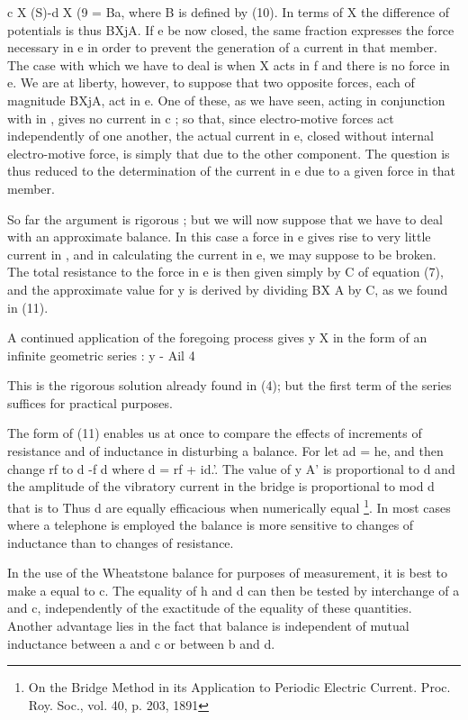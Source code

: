 c X (S)-d X (9 = Ba, where B is defined by (10). In terms of X the difference
of potentials is thus BXjA. If e be now closed, the same fraction expresses the
force necessary in e in order to prevent the generation of a current in that
member.  The case with which we have to deal is when X acts in f and there is
no force in e. We are at liberty, however, to suppose that two opposite
forces, each of magnitude BXjA, act in e. One of these, as we have seen, acting
in conjunction with in , gives no current in c ; so that, since electro-motive
forces act independently of one another, the actual current in e, closed
without internal electro-motive force, is simply that due to the other
component.  The question is thus reduced to the determination of the current in
e due to a given force in that member.

So far the argument is rigorous ; but we will now suppose that we have to deal
with an approximate balance. In this case a force in e gives rise to very
little current in , and in calculating the current in e, we may suppose  to be
broken. The total resistance to the force in e is then given simply by C of
equation (7), and the approximate value for y is derived by dividing BX A by C,
as we found in (11).

A continued application of the foregoing process gives y X in the form of an
infinite geometric series : y - Ail  4


This is the rigorous solution already found in (4); but the first term of the
series suffices for practical purposes.

The form of (11) enables us at once to compare the effects of increments of
resistance and of inductance in disturbing a balance.  For let ad = he, and
then change rf to d -f d where d = rf + id.'.  The value of y A' is
proportional to d and the amplitude of the vibratory current in the bridge is
proportional to
mod d that is to
Thus d are equally efficacious when numerically equal
\footnote{On the Bridge Method in its Application to Periodic Electric Current.
Proc.  Roy. Soc., vol. 40, p. 203, 1891}.
In most cases where a telephone is employed the balance is
more sensitive to changes of inductance than to changes of resistance.

In the use of the Wheatstone balance for purposes of measurement, it is best to
make a equal to c. The equality of h and d can then be tested by interchange of
a and c, independently of the exactitude of the equality of these quantities.
Another advantage lies in the fact that balance is independent of mutual
inductance between a and c or between b and d.


